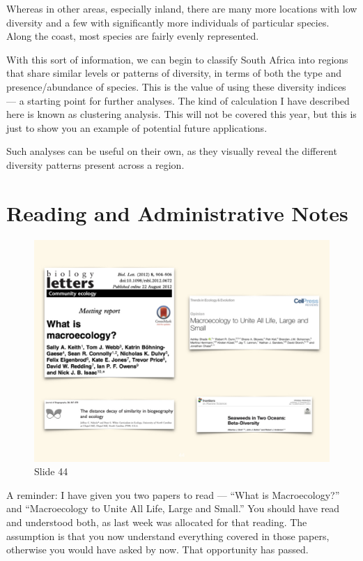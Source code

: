 \documentclass[
  12pt,
]{book}
\begin{document}
Whereas in other areas, especially inland, there are many more locations
with low diversity and a few with significantly more individuals of
particular species. Along the coast, most species are fairly evenly
represented.

With this sort of information, we can begin to classify South Africa
into regions that share similar levels or patterns of diversity, in
terms of both the type and presence/abundance of species. This is the
value of using these diversity indices --- a starting point for further
analyses. The kind of calculation I have described here is known as
clustering analysis. This will not be covered this year, but this is
just to show you an example of potential future applications.

Such analyses can be useful on their own, as they visually reveal the
different diversity patterns present across a region.

\section{Reading and Administrative
Notes}\label{reading-and-administrative-notes}

\begin{figure}[ht]
\centering
\includegraphics[width=0.8\linewidth]{../images/BDC334/BDC334-044.jpeg}
\caption*{Slide 44}
\end{figure}

A reminder: I have given you two papers to read --- ``What is
Macroecology?'' and ``Macroecology to Unite All Life, Large and Small.''
You should have read and understood both, as last week was allocated for
that reading. The assumption is that you now understand everything
covered in those papers, otherwise you would have asked by now. That
opportunity has passed.
\end{document}

